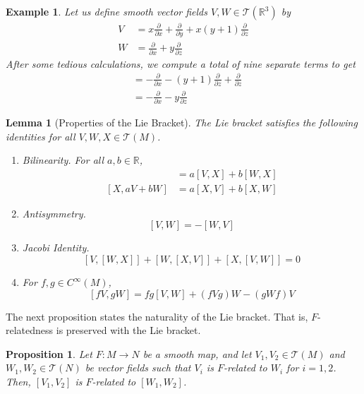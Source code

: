 \documentclass{article}
\newtheorem{proposition}[theorem]{Proposition}
\newtheorem{lemma}[theorem]{Lemma}
\newtheorem{example}{Example}[section]
\theoremstyle{remark}
\theoremstyle{definition}
\begin{document}
    \begin{example}
      Let us define smooth vector fields $V, W \in \mathcal{T}(\mathbb{R}^3)$ by 
      \begin{align*}
        V & = x \frac{\partial}{\partial x} + \frac{\partial}{\partial y} + x (y+1) \frac{\partial}{\partial z} \\
        W & = \frac{\partial}{\partial x} + y \frac{\partial}{\partial z}
      \end{align*}
      After some tedious calculations, we compute a total of nine separate terms to get 
      \begin{align*}
        [V, W] & = - \frac{\partial}{\partial x} - (y+1) \frac{\partial}{\partial z} + \frac{\partial}{\partial z} \\
        & = - \frac{\partial}{\partial x} - y \frac{\partial}{\partial z} 
      \end{align*}
    \end{example}

    \begin{lemma}[Properties of the Lie Bracket]
      The Lie bracket satisfies the following identities for all $V, W, X \in \mathcal{T}(M)$. 
      \begin{enumerate}
        \item Bilinearity. For all $a, b \in \mathbb{R}$, 
        \begin{align*}
            [a V + b W, X] & = a [V, X] + b [W, X] \\
            [X, a V + b W] & = a [X, V] + b [X, W]
        \end{align*}

        \item Antisymmetry.
        \[[V, W] = - [W, V]\]

        \item Jacobi Identity. 
        \[[V,[W,X]] + [W,[X,V]] + [X,[V,W]] = 0\]

        \item For $f, g \in C^\infty (M)$, 
        \[[f V, g W] = f g [V, W] + ( fVg) W - (gWf) V\]
      \end{enumerate}
    \end{lemma}

    The next proposition states the naturality of the Lie bracket. That is, $F$-relatedness is preserved with the Lie bracket. 

    \begin{proposition}
      Let $F: M \longrightarrow N$ be a smooth map, and let $V_1, V_2 \in \mathcal{T} (M)$ and $W_1, W_2 \in \mathcal{T}(N)$ be vector fields such that $V_i$ is $F$-related to $W_i$ for $i = 1, 2$. Then, $[V_1, V_2]$ is $F$-related to $[W_1, W_2]$. 
    \end{proposition}
\end{document}
